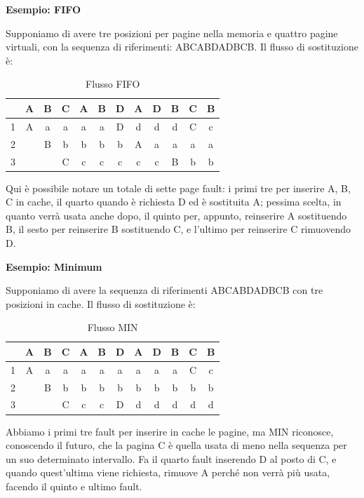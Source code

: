 \noindent\textbf{Esempio: FIFO}\par
Supponiamo di avere tre posizioni per pagine nella memoria e quattro pagine virtuali, con la sequenza di riferimenti: ABCABDADBCB. Il flusso di
sostituzione è: \begin{table}[h]
    \centering
    \begin{tabular}{|c|c|c|c|c|c|c|c|c|c|c|c|}
        \hline
         & A & B & C & A & B & D & A & D & B & C & B\\
        \hline
        1 & A & a & a & a & a & D & d & d & d & C & c\\
        \hline
        2 & & B & b & b & b & b & A & a & a & a & a\\
        \hline
        3 & & & C & c & c & c & c & c & B & b & b\\
        \hline
    \end{tabular}
    \caption{Flusso FIFO}
\end{table}

\noindent Qui è possibile notare un totale di sette page fault: i primi tre per inserire A, B, C in cache, il quarto quando è richiesta D ed è
sostituita A; pessima scelta, in quanto verrà usata anche dopo, il quinto per, appunto, reinserire A sostituendo B, il sesto per reinserire B
sostituendo C, e l'ultimo per reinserire C rimuovendo D.\newline

\noindent\textbf{Esempio: Minimum}\par
Supponiamo di avere la sequenza di riferimenti ABCABDADBCB con tre posizioni in cache. Il flusso di sostituzione è: \begin{table}[h]
    \centering
    \begin{tabular}{|c|c|c|c|c|c|c|c|c|c|c|c|}
        \hline
         & A & B & C & A & B & D & A & D & B & C & B\\
        \hline
        1 & A & a & a & a & a & a & a & a & a & C & c\\
        \hline
        2 & & B & b & b & b & b & b & b & b & b & b\\
        \hline
        3 & & & C & c & c & D & d & d & d & d & d\\
        \hline
    \end{tabular}
    \caption{Flusso MIN}
\end{table}

\noindent Abbiamo i primi tre fault per inserire in cache le pagine, ma MIN riconosce, conoscendo il futuro, che la pagina C è quella usata di meno
nella sequenza per un suo determinato intervallo. Fa il quarto fault inserendo D al posto di C, e quando quest'ultima viene richiesta, rimuove A perché
non verrà più usata, facendo il quinto e ultimo fault.\newline

